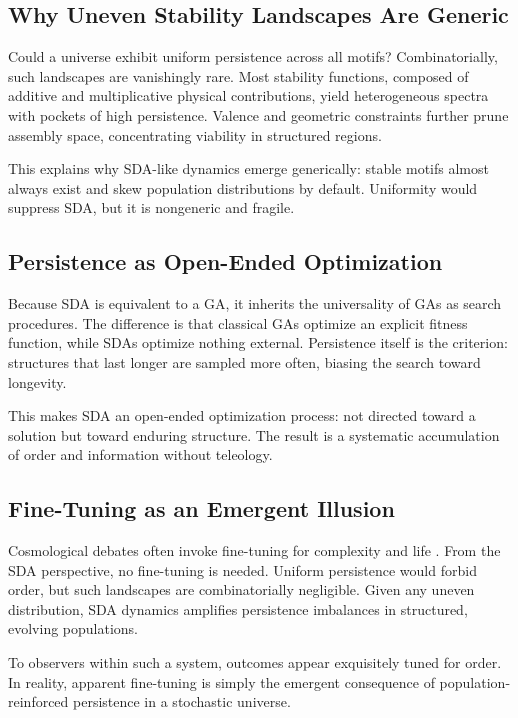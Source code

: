 \documentclass[life,article,submit,pdftex,moreauthors]{Definitions/mdpi}
\begin{document}
\subsection{Why Uneven Stability Landscapes Are Generic}
Could a universe exhibit uniform persistence across all motifs? Combinatorially, such landscapes are vanishingly rare. 
Most stability functions, composed of additive and multiplicative physical contributions, yield heterogeneous spectra with pockets of high persistence. 
Valence and geometric constraints further prune assembly space, concentrating viability in structured regions.  

This explains why SDA-like dynamics emerge generically: stable motifs almost always exist and skew population distributions by default. 
Uniformity would suppress SDA, but it is nongeneric and fragile.  

\subsection{Persistence as Open-Ended Optimization}
Because SDA is equivalent to a GA, it inherits the universality of GAs as search procedures. 
The difference is that classical GAs optimize an explicit fitness function, while SDAs optimize nothing external. 
Persistence itself is the criterion: structures that last longer are sampled more often, biasing the search toward longevity.  

This makes SDA an open-ended optimization process: not directed toward a solution but toward enduring structure. 
The result is a systematic accumulation of order and information without teleology.  

\subsection{Fine-Tuning as an Emergent Illusion}
Cosmological debates often invoke fine-tuning for complexity and life \cite{rees2000six, davies2006goldilocks}. 
From the SDA perspective, no fine-tuning is needed. 
Uniform persistence would forbid order, but such landscapes are combinatorially negligible. 
Given any uneven distribution, SDA dynamics amplifies persistence imbalances in structured, evolving populations.  

To observers within such a system, outcomes appear exquisitely tuned for order. 
In reality, apparent fine-tuning is simply the emergent consequence of population-reinforced persistence in a stochastic universe.  
\end{document}

